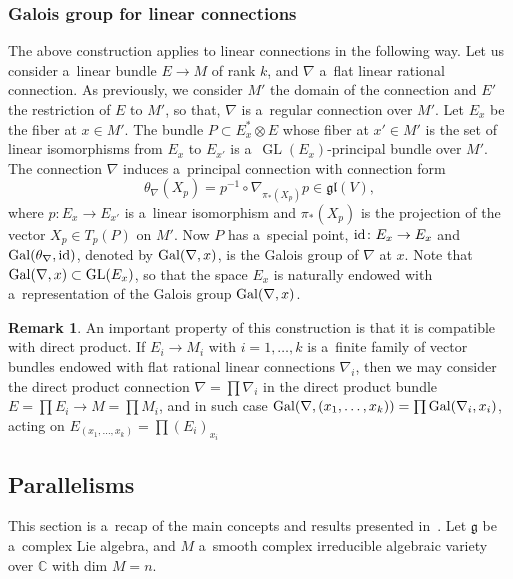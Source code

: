 \documentclass[10pt,a4paper]{amsart}
\numberwithin{equation}{section}
\theoremstyle{definition}
\newtheorem{Remark}[Theorem]{Remark}
\begin{document}
\subsubsection{Galois group for linear connections}

The above construction applies to linear connections in the following way. Let us consider a~linear bundle $E\to M$ of rank $k$, and $\nabla$ a~flat linear rational connection. As previously, we consider $M'$ the domain of the connection and $E'$ the restriction of $E$ to $M'$, so that, $\nabla$ is a~regular connection over $M'$.
Let $E_x$ be the fiber at $x \in M'$. The bundle $P \subset E_x^\ast \otimes E$ whose fiber at $x' \in M'$ is the set of linear isomorphisms from $E_x$ to $E_{x'}$ is a~$\operatorname{GL}(E_x)$-principal bundle over $M'$. The connection $\nabla$ induces a~principal connection with connection form
\[
\theta_\nabla(X_p) = p^{-1} \circ \nabla_{\pi_*(X_p)} p \in \mathfrak{gl}(V),
\]
where $p \colon E_x \to E_{x'}$ is a~linear isomorphism and $\pi_*(X_p)$ is the projection of the vector $X_p\in T_p(P)$ on $M'$. Now $P$ has a~special point, ${\rm id} \colon E_x \to E_x$ and ${\rm Gal}(\theta_\nabla, {\rm id})$, denoted by ${\rm Gal}(\nabla, x)$, is the Galois group of $\nabla$ at $x$. Note that ${\rm Gal}(\nabla, x)\subset \operatorname{GL}(E_x)$, so that the space $E_x$ is naturally endowed with a~representation of the Galois group ${\rm Gal}(\nabla, x)$.

\begin{Remark}\label{rmk_products}
An important property of this construction is that it is compatible with direct product. If $E_i\to M_i$
with $i=1,\dots, k$ is a~finite family of vector bundles endowed with flat rational linear connections $\nabla_i$, then we may consider the direct product connection $\nabla = \prod \nabla_i$ in the direct product bundle $E = \prod E_i \to M = \prod M_i$, and in such case ${\rm Gal}(\nabla, (x_1,\dots,x_k)) = \prod {\rm Gal}(\nabla_i, x_i)$, acting on $E_{(x_1,\dots,x_k)}= \prod (E_i)_{x_i}$
\end{Remark}

\subsection{Parallelisms}

This section is a~recap of the main concepts and results presented in~\cite{bc2017}. Let $\mathfrak g$ be a~complex Lie algebra, and $M$ a~smooth complex irreducible algebraic variety over $\mathbb C$ with dim $M = n$.
\end{document}
